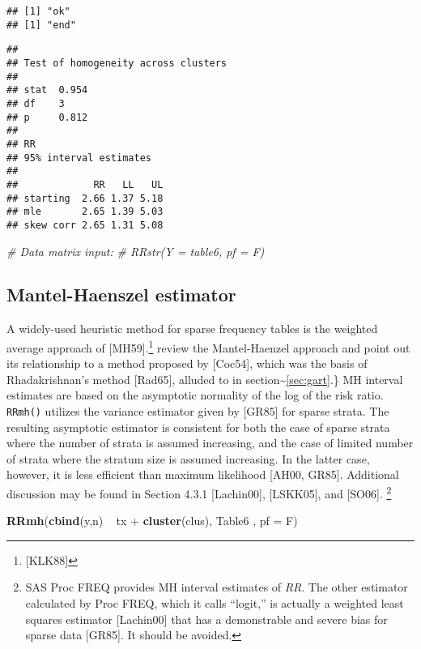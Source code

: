 \documentclass[]{article}
\newenvironment{Shaded}{\begin{snugshade}}{\end{snugshade}}
\newcommand{\KeywordTok}[1]{\textcolor[rgb]{0.13,0.29,0.53}{\textbf{{#1}}}}
\newcommand{\DataTypeTok}[1]{\textcolor[rgb]{0.13,0.29,0.53}{{#1}}}
\newcommand{\StringTok}[1]{\textcolor[rgb]{0.31,0.60,0.02}{{#1}}}
\newcommand{\CommentTok}[1]{\textcolor[rgb]{0.56,0.35,0.01}{\textit{{#1}}}}
\newcommand{\NormalTok}[1]{{#1}}
\let\rmarkdownfootnote\footnote%
\def\footnote{\protect\rmarkdownfootnote}
\begin{document}
\begin{verbatim}
## [1] "ok"
## [1] "end"
\end{verbatim}

\begin{verbatim}
## 
## Test of homogeneity across clusters
## 
## stat  0.954 
## df    3 
## p     0.812 
## 
## RR 
## 95% interval estimates
## 
##             RR   LL   UL
## starting  2.66 1.37 5.18
## mle       2.65 1.39 5.03
## skew corr 2.65 1.31 5.08
\end{verbatim}

\begin{Shaded}
\begin{Highlighting}[]
\CommentTok{# Data matrix input:}
\CommentTok{# RRstr(Y = table6, pf = F)}
\end{Highlighting}
\end{Shaded}

\subsection{Mantel-Haenszel estimator}

A widely-used heuristic method for sparse frequency tables is the
weighted average approach of {[}MH59{]}.\footnote{[KLK88]} review the
Mantel-Haenzel approach and point out its relationship to a method
proposed by {[}Coc54{]}, which was the basis of Rhadakrishnan's method
{[}Rad65{]}, alluded to in section\textasciitilde{}\ref{sec:gart}.\} MH
interval estimates are based on the asymptotic normality of the log of
the risk ratio. \texttt{RRmh()} utilizes the variance estimator given by
{[}GR85{]} for sparse strata. The resulting asymptotic estimator is
consistent for both the case of sparse strata where the number of strata
is assumed increasing, and the case of limited number of strata where
the stratum size is assumed increasing. In the latter case, however, it
is less efficient than maximum likelihood {[}AH00, GR85{]}. Additional
discussion may be found in Section 4.3.1 {[}Lachin00{]}, {[}LSKK05{]},
and {[}SO06{]}.
\footnote{SAS Proc FREQ provides MH interval estimates of \emph{RR}. The other estimator calculated by Proc FREQ, which it calls
``logit,'' is actually a weighted least squares estimator [Lachin00] that has a demonstrable and severe
bias for sparse data [GR85].  It should be avoided.}

\begin{Shaded}
\begin{Highlighting}[]
\KeywordTok{RRmh}\NormalTok{(}\KeywordTok{cbind}\NormalTok{(y,n) ~}\StringTok{ }\NormalTok{tx +}\StringTok{ }\KeywordTok{cluster}\NormalTok{(clus), Table6 , }\DataTypeTok{pf =} \NormalTok{F)}
\end{Highlighting}
\end{Shaded}
\end{document}
